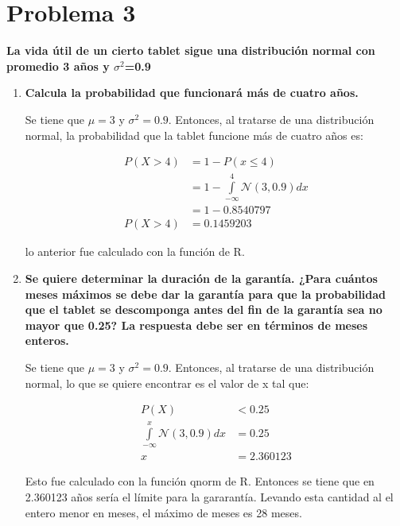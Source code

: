 \section*{Problema 3}
\textbf{La vida útil de un cierto tablet sigue una distribución normal con promedio 3 años y $\sigma^2$=0.9}

\begin{enumerate}
    \item \textbf{Calcula la probabilidad que funcionará más de cuatro años.}

          Se tiene que $\mu=3$ y $\sigma^2=0.9$. Entonces, al tratarse de una distribución normal, la probabilidad que la tablet funcione más de cuatro años es:

          \begin{align*}
              P(X>4) & = 1 - P(x\leq 4)                                    \\
                     & = 1 - \int\limits_{-\infty}^4 \mathcal{N} (3,0.9)dx \\
                     & = 1 - 0.8540797                                     \\
              P(X>4) & = 0.1459203
          \end{align*}

          lo anterior fue calculado con la función  de R.

    \item \textbf{Se quiere determinar la duración de la garantía. ¿Para cuántos meses máximos se debe dar la garantía para que la probabilidad que el tablet se descomponga antes del fin de la garantía sea no mayor que 0.25? La respuesta debe ser en términos de meses enteros.}

          Se tiene que $\mu=3$ y $\sigma^2=0.9$. Entonces, al tratarse de una distribución normal, lo que se quiere encontrar es el valor de x tal que:

          \begin{align*}
              P(X)                                          & <0.25      \\
              \int\limits_{-\infty}^x \mathcal{N} (3,0.9)dx & = 0.25     \\
              x                                             & = 2.360123
          \end{align*}

          Esto fue calculado con la función qnorm de R. Entonces se tiene que en 2.360123 años sería el límite para la gararantía. Levando esta cantidad al el entero menor en meses, el máximo de meses es 28 meses.
\end{enumerate}